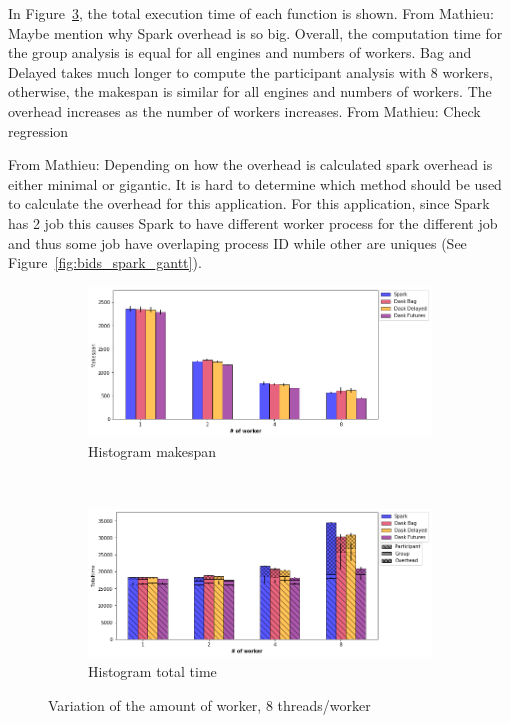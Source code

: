 \documentclass[conference]{IEEEtran}
\newcommand{\MD}[1]{\color{magenta}From Mathieu: #1 \color{black}}
\begin{document}
In Figure~\ref{fig:bids_tt_worker}, the total execution time of each function is
shown. \MD{Maybe mention why Spark overhead is so big.} Overall, the computation time
for the group analysis is equal for all engines and numbers of workers. Bag and
Delayed takes much longer to compute the participant analysis with 8 workers,
otherwise, the makespan is similar for all engines and numbers of workers. The overhead
increases as the number of workers increases. \MD{Check regression}

\MD{Depending on how the overhead is calculated spark overhead is either minimal or
gigantic. It is hard to determine which method should be used to calculate the
overhead for this application. For this application, since Spark has 2 job this
causes Spark to have different worker process for the different job and thus some job
have overlaping process ID while other are uniques (See
Figure~\ref{fig:bids_spark_gantt}).}

\begin{figure}[!t]
    \centering
    \begin{subfigure}[b]{\columnwidth}
        \includegraphics[clip,width=\columnwidth]{images/bids_worker.png}%
        \caption{Histogram makespan}\label{fig:bids_ms_worker}
    \end{subfigure}
    \\
    \begin{subfigure}[b]{\columnwidth}
        \includegraphics[clip,width=\columnwidth]{images/bids_idle_worker.png}%
        \caption{Histogram total time}\label{fig:bids_tt_worker}
    \end{subfigure}
    \caption{Variation of the amount of worker, 8 threads/worker}
\end{figure}
\end{document}
